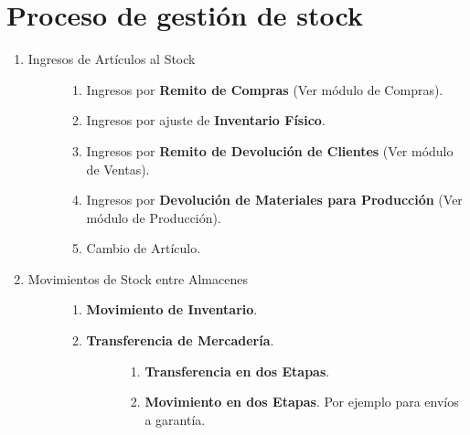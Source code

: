 \documentclass[letterpaper,10pt,spanish]{sphinxmanual}
\begin{document}
\section{Proceso de gestión de stock}
\label{stock:proceso-de-gestion-de-stock}\begin{enumerate}
\item {} \begin{description}
\item[{Ingresos de Artículos al Stock}] \leavevmode\begin{enumerate}
\item {} 
Ingresos por \textbf{Remito de Compras} (Ver módulo de Compras).

\item {} 
Ingresos por ajuste de \textbf{Inventario Físico}.

\item {} 
Ingresos por \textbf{Remito de Devolución de Clientes} (Ver módulo de Ventas).

\item {} 
Ingresos por \textbf{Devolución de Materiales para Producción}  (Ver módulo de Producción).

\item {} 
Cambio de Artículo.

\end{enumerate}

\end{description}

\item {} \begin{description}
\item[{Movimientos de Stock entre Almacenes}] \leavevmode\begin{enumerate}
\item {} 
\textbf{Movimiento de Inventario}.

\item {} \begin{description}
\item[{\textbf{Transferencia de Mercadería}.}] \leavevmode\begin{enumerate}
\item {} 
\textbf{Transferencia en dos Etapas}.

\item {} 
\textbf{Movimiento en dos Etapas}. Por ejemplo para envíos a garantía.

\end{enumerate}

\end{description}


\end{enumerate}
\end{description}
\end{enumerate}
\end{document}
